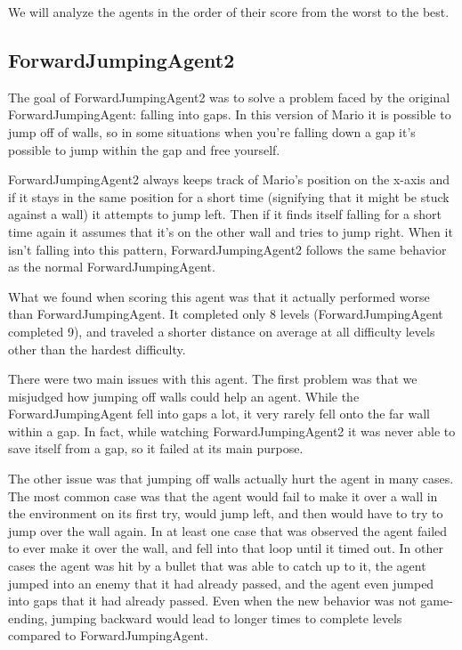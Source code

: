 \documentclass[12pt]{article}
\begin{document}
\begin{multicols*}{2}
We will analyze the agents in the order of their score from the worst to the best.
\subsection*{ForwardJumpingAgent2}
The goal of ForwardJumpingAgent2 was to solve a problem faced by the original 
ForwardJumpingAgent: falling into gaps.  In this version of Mario it is possible to jump off of walls, 
so in some situations when you're falling down a gap it's possible to jump within the gap and free 
yourself.

ForwardJumpingAgent2 always keeps track of Mario's position on the x-axis and if it stays in the 
same position for a short time (signifying that it might be stuck against a wall) it attempts to jump left.  
Then if it finds itself falling for a short time again it assumes that it's on the other wall and tries to jump 
right.  When it isn't falling into this pattern, ForwardJumpingAgent2 follows the same behavior as 
the normal ForwardJumpingAgent.

What we found when scoring this agent was that it actually performed worse than 
ForwardJumpingAgent.  It completed only 8 levels (ForwardJumpingAgent completed 9), and 
traveled a shorter distance on average at all difficulty levels other than the hardest difficulty.

There were two main issues with this agent.  The first problem was that we misjudged how 
jumping off walls could help an agent.  While the ForwardJumpingAgent fell into gaps a lot, 
it very rarely fell onto the far wall within a gap.  In fact, while watching ForwardJumpingAgent2 it was 
never able to save itself from a gap, so it failed at its main purpose.

The other issue was that jumping off walls actually hurt the agent in many cases.  The most common 
case was that the agent would fail to make it over a wall in the environment on its first try, would jump 
left, and then would have to try to jump over the wall again.  In at least one case that was observed the 
agent failed to ever make it over the wall, and fell into that loop until it timed out.  In other cases the 
agent was hit by a bullet that was able to catch up to it, the agent jumped into an enemy that it had 
already passed, and the agent even jumped into gaps that it had already passed.  Even when the 
new behavior was not game-ending, jumping backward would lead to longer times to complete levels 
compared to ForwardJumpingAgent.


\end{multicols*}
\end{document}
